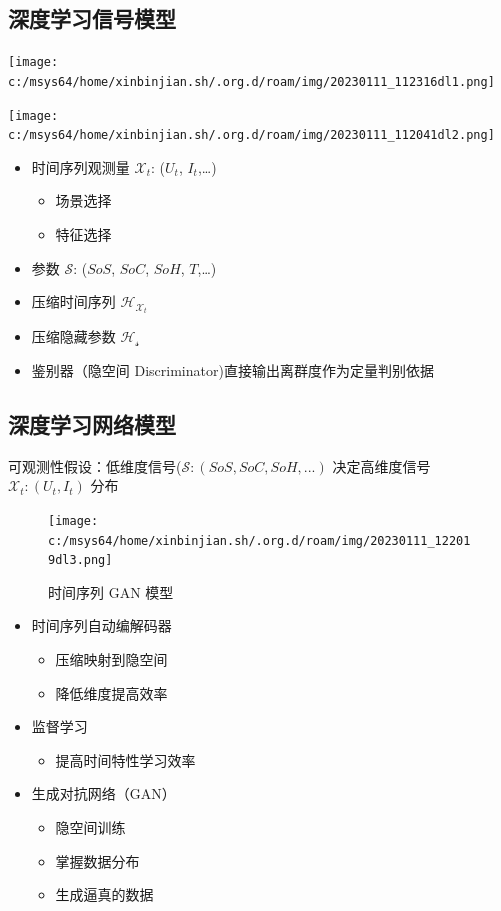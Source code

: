 \documentclass[a4paper, 11pt]{article}
\begin{document}
\subsection*{深度学习信号模型}
\label{sec:org6bf7bf2}
\begin{center}
\texttt{[image: c:/msys64/home/xinbinjian.sh/.org.d/roam/img/20230111\_112316dl1.png]}
\end{center}
\begin{center}
\texttt{[image: c:/msys64/home/xinbinjian.sh/.org.d/roam/img/20230111\_112041dl2.png]}
\end{center}
\begin{itemize}
\item 时间序列观测量 \(\mathcal{X}_t\): (\(U_t\), \(I_t\),\ldots{})
\begin{itemize}
\item 场景选择
\item 特征选择
\end{itemize}
\item 参数 \(\mathcal{S}\): (\(SoS\), \(SoC\), \(SoH\), \(T\),\ldots{})
\end{itemize}
\begin{itemize}
\item 压缩时间序列 \(\mathcal{H}_{\mathcal{X}_t}\)
\item 压缩隐藏参数  \(\mathcal{H_{\mathcal{s}}}\)
\item 鉴别器（隐空间 Discriminator)直接输出离群度作为定量判别依据
\end{itemize}
\subsection*{深度学习网络模型}
\label{sec:orgf85d30a}
可观测性假设：低维度信号(\(\mathcal{S}: (SoS, SoC, SoH,...)\)
决定高维度信号 \(\mathcal{X}_t: (U_t, I_t)\) 分布
\begin{figure}[htbp]
\centering
\texttt{[image: c:/msys64/home/xinbinjian.sh/.org.d/roam/img/20230111\_122019dl3.png]}
\caption{时间序列 GAN 模型}
\end{figure}


\begin{itemize}
\item 时间序列自动编解码器
\begin{itemize}
\item 压缩映射到隐空间
\item 降低维度提高效率
\end{itemize}
\item 监督学习
\begin{itemize}
\item 提高时间特性学习效率
\end{itemize}
\item 生成对抗网络（GAN）
\begin{itemize}
\item 隐空间训练
\item 掌握数据分布
\item 生成逼真的数据
\end{itemize}
\end{itemize}
\end{document}
